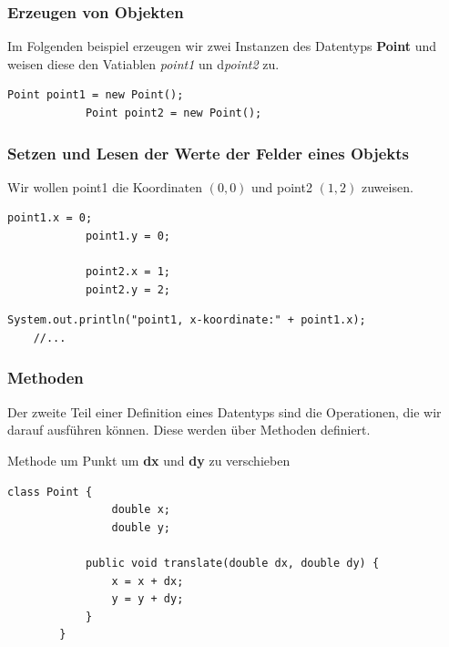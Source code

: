 \documentclass[12pt]{article}
\begin{document}
        \subsubsection*{Erzeugen von Objekten}
        Im Folgenden beispiel erzeugen wir zwei Instanzen des Datentyps \textbf{Point} und weisen diese den Vatiablen \textit{point1} un d\textit{point2} zu.

        \begin{lstlisting}[caption=Erzeugen von Objekten]
            Point point1 = new Point();
            Point point2 = new Point();
        \end{lstlisting}


        \subsubsection*{Setzen und Lesen der Werte der Felder eines Objekts}

        Wir wollen point1 die Koordinaten $(0,0)$ und point2 $(1,2)$ zuweisen.

        \begin{lstlisting}[caption=zuweisen von Werten auf Felder]
            point1.x = 0;
            point1.y = 0;

            point2.x = 1;
            point2.y = 2;
        \end{lstlisting}

        \begin{lstlisting}[caption=ausgeben der Werte]
    System.out.println("point1, x-koordinate:" + point1.x);
    //...
        \end{lstlisting}

        \subsubsection*{Methoden}

        Der zweite Teil einer Definition eines Datentyps sind die Operationen, die wir darauf ausführen können. 
        Diese werden über Methoden definiert.

        Methode um Punkt um \textbf{dx} und \textbf{dy} zu verschieben

        \begin{lstlisting}[caption=methode]
        class Point {
                double x; 
                double y;

            public void translate(double dx, double dy) {
                x = x + dx;
                y = y + dy;
            }
        }
        \end{lstlisting}
\end{document}
